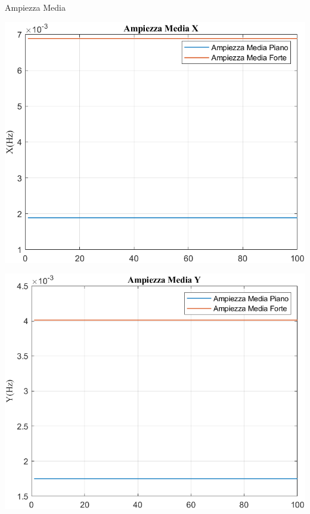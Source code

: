 	
	\begin{frame}{{Ampiezza Media}}
		\begin{minipage}{.45\textwidth}
			\centering\includegraphics[width=.9\textwidth]{figure/Vel/Trasformata/Ampiezza MediaX}
		\end{minipage}
		\hspace{.05\textwidth}
		\begin{minipage}{.45\textwidth}
			\centering\includegraphics[width=.9\textwidth]{figure/Vel/Trasformata/Ampiezza MediaY}
		\end{minipage}
	\end{frame}
	

